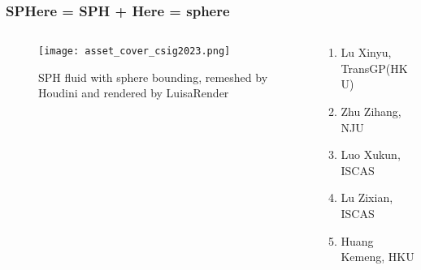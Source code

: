 \begin{frame}
    \frametitle{SPHere = SPH + Here = sphere}
    \begin{columns}[c]
        \begin{column}{0.58\textwidth} %
            \begin{figure}
                \texttt{[image: asset\_cover\_csig2023.png]}
                \caption{SPH fluid with sphere bounding, remeshed by Houdini and rendered by LuisaRender}
            \end{figure}
        \end{column}
        \begin{column}{0.4\textwidth} %
            \begin{enumerate}
                \item Lu Xinyu, TransGP(HKU)
                \item Zhu Zihang, NJU
                \item Luo Xukun, ISCAS
                \item Lu Zixian, ISCAS
                \item Huang Kemeng, HKU
            \end{enumerate}
        \end{column}
    \end{columns}
\end{frame}